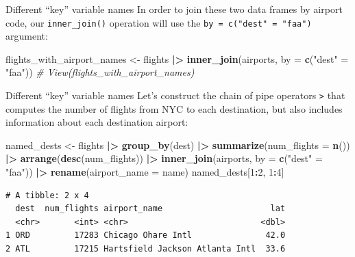 \documentclass[
  ignorenonframetext,
]{beamer}
\newenvironment{Shaded}{\begin{snugshade}}{\end{snugshade}}
\newcommand{\AttributeTok}[1]{\textcolor[rgb]{0.13,0.29,0.53}{#1}}
\newcommand{\CommentTok}[1]{\textcolor[rgb]{0.56,0.35,0.01}{\textit{#1}}}
\newcommand{\DecValTok}[1]{\textcolor[rgb]{0.00,0.00,0.81}{#1}}
\newcommand{\FunctionTok}[1]{\textcolor[rgb]{0.13,0.29,0.53}{\textbf{#1}}}
\newcommand{\NormalTok}[1]{#1}
\newcommand{\OtherTok}[1]{\textcolor[rgb]{0.56,0.35,0.01}{#1}}
\newcommand{\SpecialCharTok}[1]{\textcolor[rgb]{0.81,0.36,0.00}{\textbf{#1}}}
\newcommand{\StringTok}[1]{\textcolor[rgb]{0.31,0.60,0.02}{#1}}
\begin{document}
\begin{frame}[fragile]{Different ``key'' variable names}
\protect\hypertarget{different-key-variable-names-1}{}
In order to join these two data frames by airport code, our
\texttt{inner\_join()} operation will use the
\texttt{by\ =\ c("dest"\ =\ "faa")} argument:

\normalsize

\begin{Shaded}
\begin{Highlighting}[]
\NormalTok{flights\_with\_airport\_names }\OtherTok{\textless{}{-}}\NormalTok{ flights }\SpecialCharTok{|\textgreater{}} 
  \FunctionTok{inner\_join}\NormalTok{(airports, }\AttributeTok{by =} \FunctionTok{c}\NormalTok{(}\StringTok{"dest"} \OtherTok{=} \StringTok{"faa"}\NormalTok{))}
\CommentTok{\# View(flights\_with\_airport\_names)}
\end{Highlighting}
\end{Shaded}

\normalsize
\end{frame}

\begin{frame}[fragile]{Different ``key'' variable names}
\protect\hypertarget{different-key-variable-names-2}{}
Let's construct the chain of pipe operators
\texttt{\textbar{}\textgreater{}} that computes the number of flights
from NYC to each destination, but also includes information about each
destination airport:

\normalsize

\begin{Shaded}
\begin{Highlighting}[]
\NormalTok{named\_dests }\OtherTok{\textless{}{-}}\NormalTok{ flights }\SpecialCharTok{|\textgreater{}}
  \FunctionTok{group\_by}\NormalTok{(dest) }\SpecialCharTok{|\textgreater{}}
  \FunctionTok{summarize}\NormalTok{(}\AttributeTok{num\_flights =} \FunctionTok{n}\NormalTok{()) }\SpecialCharTok{|\textgreater{}}
  \FunctionTok{arrange}\NormalTok{(}\FunctionTok{desc}\NormalTok{(num\_flights)) }\SpecialCharTok{|\textgreater{}}
  \FunctionTok{inner\_join}\NormalTok{(airports, }\AttributeTok{by =} \FunctionTok{c}\NormalTok{(}\StringTok{"dest"} \OtherTok{=} \StringTok{"faa"}\NormalTok{)) }\SpecialCharTok{|\textgreater{}}
  \FunctionTok{rename}\NormalTok{(}\AttributeTok{airport\_name =}\NormalTok{ name)}
\NormalTok{named\_dests[}\DecValTok{1}\SpecialCharTok{:}\DecValTok{2}\NormalTok{, }\DecValTok{1}\SpecialCharTok{:}\DecValTok{4}\NormalTok{]}
\end{Highlighting}
\end{Shaded}

\begin{verbatim}
# A tibble: 2 x 4
  dest  num_flights airport_name                      lat
  <chr>       <int> <chr>                           <dbl>
1 ORD         17283 Chicago Ohare Intl               42.0
2 ATL         17215 Hartsfield Jackson Atlanta Intl  33.6
\end{verbatim}

\normalsize
\end{frame}
\end{document}
